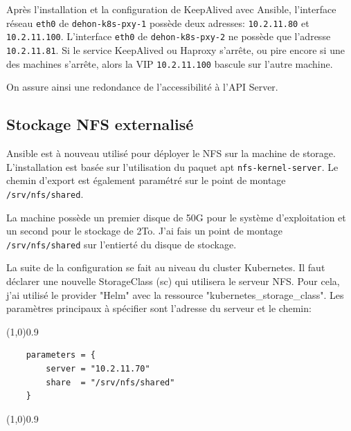 \documentclass[12pt, a4paper, twoside]{article}
\begin{document}
Après l'installation et la configuration de KeepAlived avec \gls{Ansible}, l'interface réseau \verb|eth0| de \verb|dehon-k8s-pxy-1| possède deux adresses: \verb|10.2.11.80| et \verb|10.2.11.100|.
L'interface \verb|eth0| de \verb|dehon-k8s-pxy-2| ne possède que l'adresse \verb|10.2.11.81|.
Si le service KeepAlived ou Haproxy s'arrête, ou pire encore si une des machines s'arrête, alors la \gls{VIP}  \verb|10.2.11.100| bascule sur l'autre machine.

On assure ainsi une redondance de l'accessibilité à l'\gls{API} Server.

\subsection{Stockage NFS externalisé}
\gls{Ansible} est à nouveau utilisé pour déployer le NFS sur la machine de storage.
L'installation est basée sur l'utilisation du paquet apt \verb|nfs-kernel-server|.
Le chemin d'export est également paramétré sur le point de montage \verb|/srv/nfs/shared|.

La machine possède un premier disque de 50G pour le système d'exploitation et un second pour le stockage de 2To.
J'ai fais un point de montage \verb|/srv/nfs/shared| sur l'entierté du disque de stockage.

La suite de la configuration se fait au niveau du \gls{cluster} \gls{Kubernetes}.
Il faut déclarer une nouvelle StorageClass (sc) qui utilisera le serveur NFS.
Pour cela, j'ai utilisé le provider "Helm" avec la ressource "kubernetes\_storage\_class".
Les paramètres principaux à spécifier sont l'adresse du serveur et le chemin:
\vspace{-1ex}
\begin{code}
\vspace{-1ex}
\begin{center} 
    \line(1,0){0.9\textwidth} 
\end{center}
\vspace{-1ex}
\begin{verbatim}
    parameters = {
        server = "10.2.11.70"
        share  = "/srv/nfs/shared"
    }
\end{verbatim}
\vspace{-1ex}
\begin{center} 
    \line(1,0){0.9\textwidth} 
\end{center}
\vspace{-1ex}
\end{code}
\end{document}
